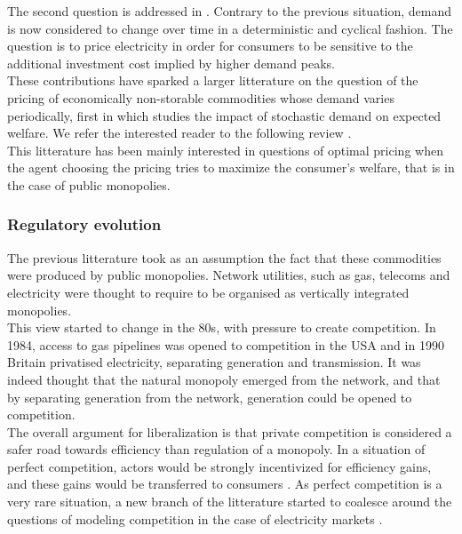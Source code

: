 The second question is addressed in \cite{boiteux1960peak}. Contrary to the previous situation, demand is now considered to change over time in a deterministic and cyclical fashion. The question is to price electricity in order for consumers to be sensitive to the additional investment cost implied by higher demand peaks. \\

These contributions have sparked a larger litterature on the question of the pricing of economically non-storable commodities whose demand varies periodically, first in \cite{brown1969public} which studies the impact of stochastic demand on expected welfare. We refer the interested reader to the following review \cite{crew1995theory}. \\ 

This litterature has been mainly interested in questions of optimal pricing when the agent choosing the pricing tries to maximize the consumer's welfare, that is in the case of public monopolies. \\

\subsubsection*{Regulatory evolution}
The previous litterature took as an assumption the fact that these commodities were produced by public monopolies. Network utilities, such as gas, telecoms and electricity were thought to require to be organised as vertically integrated monopolies. \\

This view started to change in the 80s, with pressure to create competition. In 1984, access to gas pipelines was opened to competition in the USA and in 1990 Britain privatised electricity, separating generation and transmission. It was indeed thought that the natural monopoly emerged from the network, and that by separating generation from the network, generation could be opened to competition. \\

The overall argument for liberalization is that private competition is considered a safer road towards efficiency than regulation of a monopoly. In a situation of perfect competition, actors would be strongly incentivized for efficiency gains, and these gains would be transferred to consumers \cite{schmidt1996costs}. As perfect competition is a very rare situation, a new branch of the litterature started to coalesce around the questions of modeling competition in the case of electricity markets \cite{newbery1997privatisation}. \\

